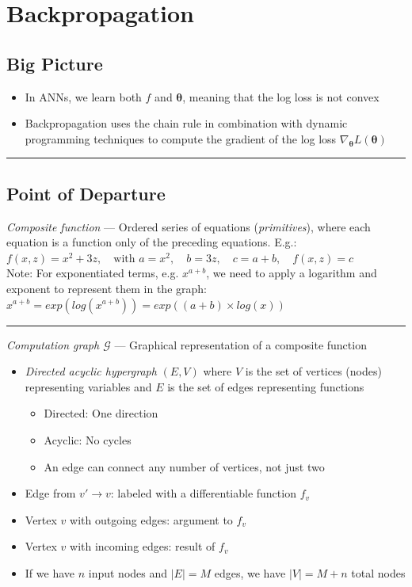 \section{Backpropagation}
\subsection*{Big Picture}
\begin{itemize}
    \item In ANNs, we learn both $f$ and $\boldsymbol{\theta}$, meaning that the log loss is not convex
    \item Backpropagation uses the chain rule in combination with dynamic programming techniques to compute the gradient of the log loss $\nabla_{\boldsymbol{\theta}} L(\boldsymbol{\theta})$
\end{itemize}

{\color{black}\hrule height 0.001mm}

\subsection*{Point of Departure}

\emph{Composite function} --- Ordered series of equations (\emph{primitives}), where each equation is a function only of the preceding equations. E.g.:
$
f(x, z) = x^2 + 3z, \quad \textrm{with }
a = x^2, \quad b = 3z, \quad c = a + b, \quad f(x, z) = c
$\\
Note: For exponentiated terms, e.g. $x^{a+b}$, we need to apply a logarithm and exponent to represent them in the graph: $x^{a+b} = exp(log(x^{a+b})) =  exp((a+b) \times log(x))$

{\color{lightgray}\hrule height 0.001mm}

\emph{Computation graph $\mathcal{G}$} --- Graphical representation of a composite function
\begin{itemize}
    \item \emph{Directed acyclic hypergraph} $(E, V)$ where $V$ is the set of vertices (nodes) representing variables and $E$ is the set of edges representing functions
    \begin{itemize}
        \item Directed: One direction
        \item Acyclic: No cycles
        \item An edge can connect any number of vertices, not just two
    \end{itemize}
    \item Edge from $v' \to v$: labeled with a differentiable function $f_v$
    \item Vertex $v$ with outgoing edges: argument to $f_v$
    \item Vertex $v$ with incoming edges: result of $f_v$
    \item If we have $n$ input nodes and $|E| = M$ edges, we have $|V| = M + n$ total nodes
\end{itemize}

